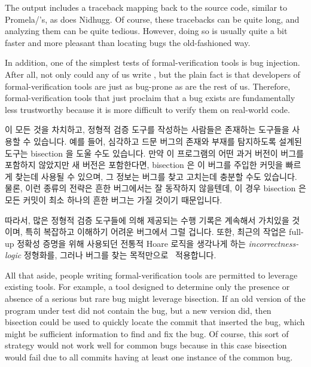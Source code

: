 The  output includes a traceback mapping back to the source
code, similar to Promela/'s, as does Nidhugg.
Of course, these tracebacks can be quite long, and analyzing them
can be quite tedious.
However, doing so is usually quite a bit faster
and more pleasant than locating bugs the old-fashioned way.

In addition, one of the simplest tests of formal-verification tools is
bug injection.
After all, not only could any of us write
, but the plain fact is that
developers of formal-verification tools are just as bug-prone as
are the rest of us.
Therefore, formal-verification tools that just proclaim that a
bug exists are fundamentally less trustworthy because it is
more difficult to verify them on real-world code.

\fi

이 모든 것을 차치하고, 정형적 검증 도구를 작성하는 사람들은 존재하는 도구들을
사용할 수 있습니다.
예를 들어, 심각하고 드문 버그의 존재와 부재를 탐지하도록 설계된 도구는
bisection 을 도울 수도 있습니다.
만약 이 프로그램의 어떤 과거 버전이 버그를 포함하지 않았지만 새 버전은
포함한다면, bisection 은 이 버그를 주입한 커밋을 빠르게 찾는데 사용될 수
있으며, 그 정보는 버그를 찾고 고치는데 충분할 수도 있습니다.
물론, 이런 종류의 전략은 흔한 버그에서는 잘 동작하지 않을텐데, 이 경우
bisection 은 모든 커밋이 최소 하나의 흔한 버그는 가질 것이기 때문입니다.

따라서, 많은 정형적 검증 도구들에 의해 제공되는 수행 기록은 계속해서 가치있을
것이며, 특히 복잡하고 이해하기 어려운 버그에서 그럴 겁니다.
또한, 최근의 작업은 full-up 정확성 증명을 위해 사용되던 전통적 Hoare 로직을
생각나게 하는 \emph{incorrectness-logic} 정형화를, 그러나 버그를 찾는
목적만으로~\cite{PeterWOHearn2019incorrectnessLogic} 적용합니다. 

\iffalse

All that aside, people writing formal-verification tools are
permitted to leverage existing tools.
For example, a tool designed to determine only the presence
or absence of a serious but rare bug might leverage bisection.
If an old version of the program under test did not contain the bug,
but a new version did, then bisection could be used to quickly
locate the commit that inserted the bug, which might be
sufficient information to find and fix the bug.
Of course, this sort of strategy would not work well for common
bugs because in this case bisection would fail due to all commits
having at least one instance of the common bug.

